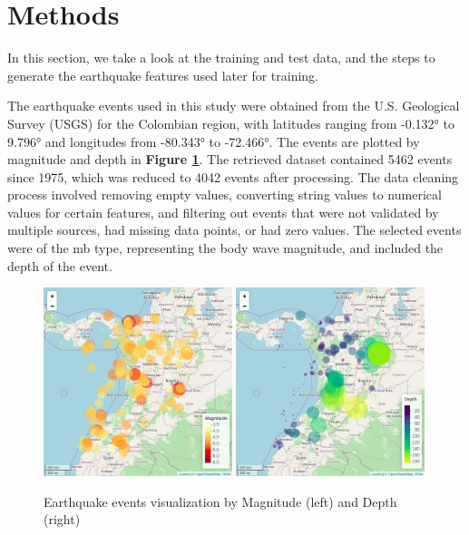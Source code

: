 \documentclass[sn-mathphys-num]{sn-jnl}
\begin{document}
\section{Methods}\label{methods}

In this section, we take a look at the training and test data, and the steps to generate the earthquake features used later for training.

The earthquake events used in this study were obtained from the U.S. Geological Survey (USGS) for the Colombian region, with latitudes ranging from -0.132° to 9.796° and longitudes from -80.343° to -72.466°. The events are plotted by magnitude and depth in \textbf{Figure \ref{fig1}}. The retrieved dataset contained 5462 events since 1975, which was reduced to 4042 events after processing. The data cleaning process involved removing empty values, converting string values to numerical values for certain features, and filtering out events that were not validated by multiple sources, had missing data points, or had zero values. The selected events were of the mb type, representing the body wave magnitude, and included the depth of the event.

\begin{figure}[H]
    \includegraphics[width=0.49\textwidth]{img/mag01.png}
    \includegraphics[width=0.49\textwidth]{img/depth01.png}
    \caption{Earthquake events visualization by Magnitude (left) and Depth (right)}\label{fig1}
\end{figure}
\unskip
\end{document}
